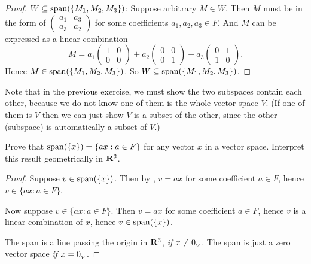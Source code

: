 \begin{proof}
\(W \subseteq \operatorname{span}(\{M_1, M_2, M_3\})\):
Suppose arbitrary \(M \in W\).
Then \(M\) must be in the form of
\(
    \begin{pmatrix}
        a_1 & a_3 \\
        a_3 & a_2
    \end{pmatrix}
\) for some coefficients \(a_1, a_2, a_3 \in F\).
And \(M\) can be expressed as a linear combination
\[
    M = a_1 \begin{pmatrix}
            1 & 0 \\
            0 & 0
        \end{pmatrix}
        + a_2 \begin{pmatrix}
            0 & 0 \\
            0 & 1
        \end{pmatrix}
        + a_3 \begin{pmatrix}
            0 & 1 \\
            1 & 0
        \end{pmatrix}.
\]
Hence \(M \in \operatorname{span}(\{M_1, M_2, M_3\})\).
So \(W \subseteq \operatorname{span}(\{M_1, M_2, M_3\})\).
\end{proof}

\begin{note}
Note that in the previous exercise, we must show the two subspaces contain each other, because we do not know one of them is the whole vector space \(V\).
(If one of them is \(V\) then we can just show \(V\) is a subset of the other, since the other (subspace) is automatically a subset of \(V\).)
\end{note}

\begin{exercise} \label{exercise 1.4.11}
Prove that \(\operatorname{span}(\{ x \}) = \{ ax: a \in F \}\) for any vector \(x\) in a vector space.
Interpret this result geometrically in \(\mathbf{R}^3\).
\end{exercise}

\begin{proof}
Suppose \(v \in \operatorname{span}(\{ x \})\).
Then by , \(v = a x\) for some coefficient \(a \in F\), hence \(v \in \{ ax: a \in F \}\).

Now suppose \(v \in \{ ax: a \in F \}\).
Then \(v = a x\) for some coefficient \(a \in F\), hence \(v\) is a linear combination of \(x\), hence \(v \in \operatorname{span}(\{ x\})\).

The span is a line passing the origin in \(\mathbf{R}^3\), \emph{if} \(x \ne 0_{_V}\).
The span is just a zero vector space \emph{if} \(x = 0_{_V}\).
\end{proof}

